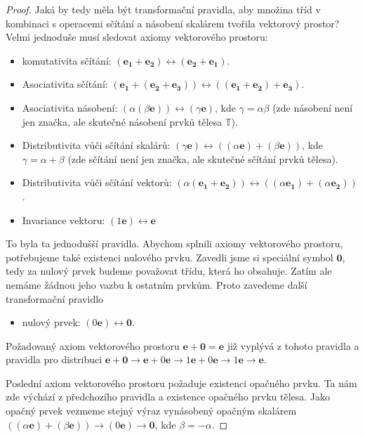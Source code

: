 \documentclass[a5paper,12pt]{amsbook}
\theoremstyle{definition}
\newcommand{\myvec}[1]{\bm{#1}}
\newcommand{\myspace}[1]{\mathbb{#1}}
\begin{document}
\begin{proof}
Jaká by tedy měla být transformační pravidla, aby množina tříd v kombinaci s operacemi
sčítání a násobení skalárem tvořila vektorový prostor? Velmi jednoduše musí sledovat
axiomy vektorového prostoru:
\begin{itemize}
\item komutativita sčítání: $(\myvec{e_1}+\myvec{e_2}) \leftrightarrow (\myvec{e_2}+\myvec{e_1})$.
\item Asociativita sčítání: $(\myvec{e_1}+(\myvec{e_2}+\myvec{e_3})) 
    \leftrightarrow ((\myvec{e_1}+\myvec{e_2})+\myvec{e_3})$.
\item Asociativita násobení: $(\alpha(\beta\myvec{e})) \leftrightarrow (\gamma\myvec{e})$, kde
    $\gamma = \alpha\beta$ (zde násobení není jen značka, ale skutečné násobení prvků
    tělesa $\myspace{T}$).
\item Distributivita vůči sčítání skalárů: $(\gamma\myvec{e}) 
    \leftrightarrow ((\alpha\myvec{e})+(\beta\myvec{e}))$, kde $\gamma = \alpha + \beta$
    (zde sčítání není jen značka, ale skutečné sčítání prvků tělesa).
\item Distributivita vůči sčítání vektorů: $(\alpha(\myvec{e_1} + \myvec{e_2}))
    \leftrightarrow ((\alpha\myvec{e_1}) + (\alpha\myvec{e_2}))$.
\item Invariance vektoru: $(1\myvec{e}) \leftrightarrow \myvec{e}$
\end{itemize}
To byla ta jednodušší pravidla. Abychom splnili axiomy vektorového prostoru, potřebujeme
také existenci nulového prvku. Zavedli jsme si speciální symbol $\myvec{0}$, tedy za nulový
prvek budeme považovat třídu, která ho obsahuje. Zatím ale nemáme žádnou jeho vazbu
k ostatním prvkům. Proto zavedeme další transformační pravidlo
\begin{itemize}
\item nulový prvek: $(0\myvec{e}) \leftrightarrow \myvec{0}$.
\end{itemize}
Požadovaný axiom vektorového prostoru $\myvec{e} + \myvec{0} = \myvec{e}$ již vyplývá
z tohoto pravidla a pravidla pro distribuci $\myvec{e} + \myvec{0} \rightarrow
\myvec{e} + 0\myvec{e} \rightarrow 1\myvec{e} + 0\myvec{e} \rightarrow 1\myvec{e}
\rightarrow \myvec{e}$.

Poslední axiom vektorového prostoru požaduje existenci opačného prvku. Ta nám zde
výchází z předchozího pravidla a existence opačného prvku tělesa. Jako opačný prvek
vezmeme stejný výraz vynásobený opačným skalárem $((\alpha\myvec{e}) + (\beta\myvec{e}))
\rightarrow (0\myvec{e}) \rightarrow \myvec{0}$, kde $\beta = -\alpha$.


\end{proof}
\end{document}
